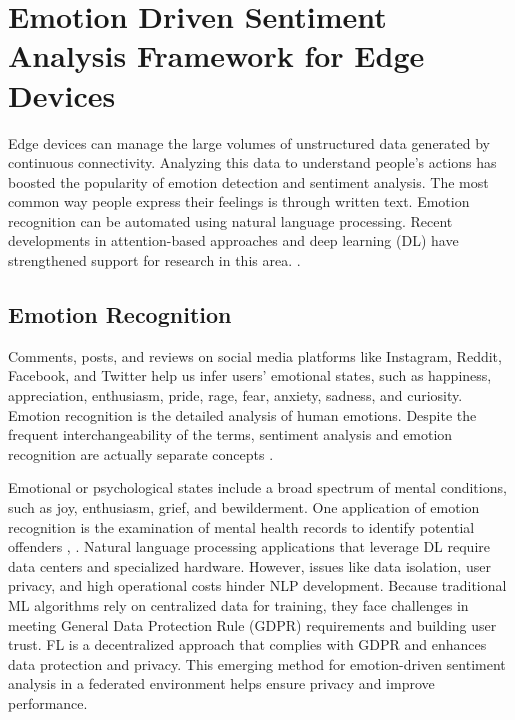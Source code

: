 \chapter{Emotion Driven Sentiment Analysis Framework for Edge Devices}
Edge devices can manage the large volumes of unstructured data generated by continuous connectivity. Analyzing this data to understand people's actions has boosted the popularity of emotion detection and sentiment analysis. The most common way people express their feelings is through written text. Emotion recognition can be automated using natural language processing. Recent developments in attention-based approaches and deep learning (DL) have strengthened support for research in this area. \cite{ref55}.

\section{Emotion Recognition}
Comments, posts, and reviews on social media platforms like Instagram, Reddit, Facebook, and Twitter help us infer users' emotional states, such as happiness, appreciation, enthusiasm, pride, rage, fear, anxiety, sadness, and curiosity. Emotion recognition is the detailed analysis of human emotions. Despite the frequent interchangeability of the terms, sentiment analysis and emotion recognition are actually separate concepts \cite{ref28} .

Emotional or psychological states include a broad spectrum of mental conditions, such as joy, enthusiasm, grief, and bewilderment. One application of emotion recognition is the examination of mental health records to identify potential offenders \cite{ref51}, \cite{ref52}. Natural language processing applications that leverage DL require data centers and specialized hardware. However, issues like data isolation, user privacy, and high operational costs hinder NLP development. Because traditional ML algorithms rely on centralized data for training, they face challenges in meeting General Data Protection Rule (GDPR) requirements and building user trust. FL is a decentralized approach that complies with GDPR and enhances data protection and privacy. This emerging method for emotion-driven sentiment analysis in a federated environment helps ensure privacy and improve performance.

